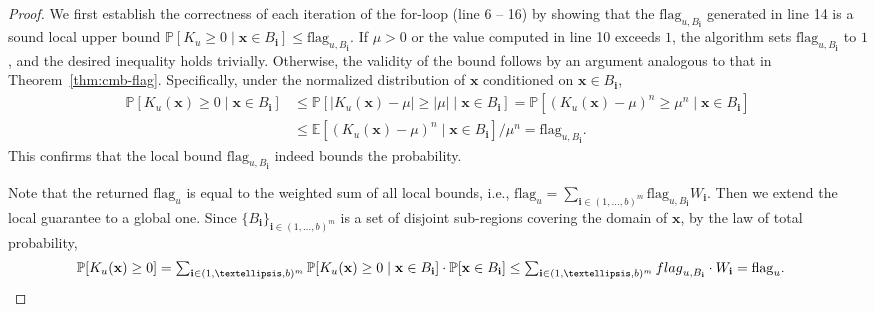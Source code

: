 \documentclass[10pt,a4paper]{amsart}
\newcommand{\flag}{\mathrm{flag}}
\begin{document}
\begin{proof}
We first establish the correctness of each iteration of the for-loop (line 6 -- 16) by showing that the $\flag_{u, B_{\mathbf i}}$ generated in line 14 is a sound local upper bound 
$\mathbb P[K_u \ge 0 \mid \mathbf x \in B_{\mathbf i}] \le \flag_{u, B_{\mathbf i}}.$
If $\mu > 0$  or the value computed in line 10 exceeds $1$, the algorithm sets $\flag_{u,B_{\mathbf i}}$ to $1$, and the desired inequality holds trivially. 
Otherwise, the validity of the bound follows by an argument analogous to that in Theorem~\ref{thm:cmb-flag}.
Specifically, under the normalized distribution of $\mathbf x$ conditioned on $\mathbf x\in B_{\mathbf i}$,
$$\begin{aligned}
\mathbb P[K_u(\mathbf x) \ge 0\mid \mathbf x \in B_{\mathbf i}] &\le \mathbb P[|K_u(\mathbf x) - \mu| \ge |\mu|\mid \mathbf x \in B_{\mathbf i}] =\mathbb P[(K_u(\mathbf x) - \mu)^n \ge \mu^n\mid \mathbf x \in B_{\mathbf i}] \\
&\le {\mathbb E[(K_u(\mathbf x) - \mu)^n\mid \mathbf x \in B_{\mathbf i}]}/{\mu^n} = \flag_{u, B_{\mathbf i}}.
\end{aligned}$$
This confirms that the local bound $\flag_{u, B_{\mathbf i}}$ indeed bounds the probability. 

Note that the returned $\flag_u$ is equal to the weighted sum of all local bounds, i.e.,
$\flag_u = \sum_{\mathbf i \in (1, \dots, b)^m}\flag_{u, B_{\mathbf i}}W_{\mathbf i}.$
Then we extend the local guarantee to a global one.
Since $\{B_{\mathbf i}\}_{\mathbf i\in (1, \dots, b)^m}$ is a set of disjoint sub-regions covering the domain of $\mathbf x$,
by the law of total probability,
$$\begin{aligned}
\mathbb P[K_u(\mathbf x) \ge 0] &= \textstyle\sum_{\mathbf i \in (1, \dots, b)^m} \mathbb P[K_u(\mathbf x) \ge 0 \mid \mathbf x \in B_{\mathbf i}] \cdot \mathbb P[\mathbf x \in B_{\mathbf i}] 
\le \textstyle\sum_{\mathbf i \in (1, \dots, b)^m} \mathbb  \flag_{u, B_{\mathbf i}}\cdot W_{\mathbf i} = \flag_u.
\end{aligned}$$
\end{proof}
\end{document}
